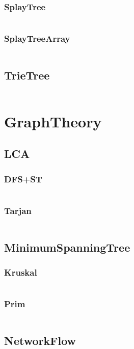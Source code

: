 \documentclass[a4paper,11pt]{article}
\begin{document}
\subsubsection{SplayTree}
\inputminted[breaklines]{c++}{03++DataStructure/+Splay/+SplayTree.cpp}
\subsubsection{SplayTreeArray}
\inputminted[breaklines]{c++}{03++DataStructure/+Splay/+SplayTreeArray.cpp}

\subsection{TrieTree}
\inputminted[breaklines]{c++}{03++DataStructure/+TrieTree.cpp}

\newpage
\section{GraphTheory}
\subsection{LCA}
\subsubsection{DFS+ST}
\inputminted[breaklines]{c++}{04++GraphTheory/+LCA/+DFS+ST.cpp}
\subsubsection{Tarjan}
\inputminted[breaklines]{c++}{04++GraphTheory/+LCA/+Tarjan.cpp}

\subsection{MinimumSpanningTree}
\subsubsection{Kruskal}
\inputminted[breaklines]{c++}{04++GraphTheory/+MinimumSpanningTree/+Kruskal.cpp}
\subsubsection{Prim}
\inputminted[breaklines]{c++}{04++GraphTheory/+MinimumSpanningTree/+Prim.cpp}

\subsection{NetworkFlow}
\end{document}

